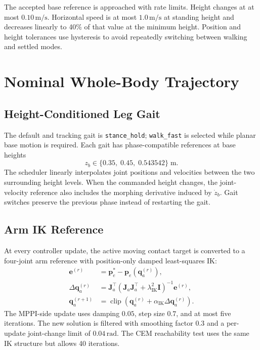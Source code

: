 \documentclass[11pt,a4paper]{article}
\newcommand{\clip}{\operatorname{clip}}
\newcommand{\code}[1]{\texttt{#1}}
\begin{document}
The accepted base reference is approached with rate limits. Height changes at
at most $0.10\,\mathrm{m/s}$. Horizontal speed is at most
$1.0\,\mathrm{m/s}$ at standing height and decreases linearly to 40\% of that
value at the minimum height. Position and height tolerances use hysteresis to
avoid repeatedly switching between walking and settled modes.

\section{Nominal Whole-Body Trajectory}

\subsection{Height-Conditioned Leg Gait}

The default and tracking gait is \code{stance\_hold}; \code{walk\_fast} is
selected while planar base motion is required. Each gait has phase-compatible
references at base heights
\begin{equation}
  z_b\in\{0.35,\;0.45,\;0.543542\}\;\mathrm{m}.
\end{equation}
The scheduler linearly interpolates joint positions and velocities between
the two surrounding height levels. When the commanded height changes, the
joint-velocity reference also includes the morphing derivative induced by
$\dot z_b$. Gait switches preserve the previous phase instead of restarting
the gait.

\subsection{Arm IK Reference}

At every controller update, the active moving contact target is converted to
a four-joint arm reference with position-only damped least-squares IK:
\begin{align}
  \bm{e}^{(r)}
  &=\bm{p}_e^*-\bm{p}_e(\bm{q}_a^{(r)}),\\
  \Delta\bm{q}_a^{(r)}
  &=\bm{J}_a^\top
    \left(\bm{J}_a\bm{J}_a^\top+\lambda_{\mathrm{IK}}^2\bm{I}\right)^{-1}
    \bm{e}^{(r)},\\
  \bm{q}_a^{(r+1)}
  &=\clip\left(
    \bm{q}_a^{(r)}+\alpha_{\mathrm{IK}}\Delta\bm{q}_a^{(r)}
    \right).
\end{align}
The MPPI-side update uses damping $0.05$, step size $0.7$, and at most five
iterations. The new solution is filtered with smoothing factor $0.3$ and a
per-update joint-change limit of $0.04\,\mathrm{rad}$. The CEM reachability
test uses the same IK structure but allows 40 iterations.
\end{document}
